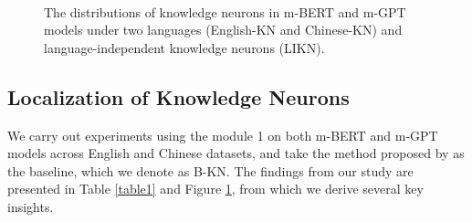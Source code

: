 \documentclass[]{article}
\begin{document}
\begin{figure}
   \centering
   \\
   \caption{The distributions of knowledge neurons in m-BERT and m-GPT models under two languages (English-KN and Chinese-KN) and language-independent knowledge neurons (LIKN).}
   \label{fig3} 
\end{figure}

\subsection{Localization of Knowledge Neurons}
We carry out experiments using the module 1 on both m-BERT and m-GPT models across English and Chinese datasets, and take the method proposed by \citeauthor{dai2022kn} as the baseline, which we denote as B-KN.
The findings from our study are presented in Table \ref{table1} and Figure \ref{fig3}, from which we derive several key insights.
\end{document}
